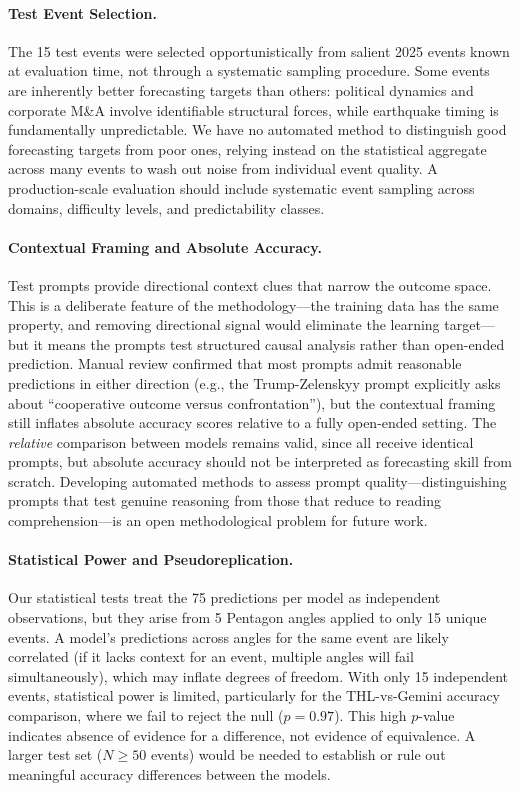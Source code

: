 \documentclass[11pt,a4paper]{article}
\begin{document}
\paragraph{Test Event Selection.}
The 15 test events were selected opportunistically from salient 2025 events known at evaluation time, not through a systematic sampling procedure. Some events are inherently better forecasting targets than others: political dynamics and corporate M\&A involve identifiable structural forces, while earthquake timing is fundamentally unpredictable. We have no automated method to distinguish good forecasting targets from poor ones, relying instead on the statistical aggregate across many events to wash out noise from individual event quality. A production-scale evaluation should include systematic event sampling across domains, difficulty levels, and predictability classes.

\paragraph{Contextual Framing and Absolute Accuracy.}
Test prompts provide directional context clues that narrow the outcome space. This is a deliberate feature of the methodology---the training data has the same property, and removing directional signal would eliminate the learning target---but it means the prompts test structured causal analysis rather than open-ended prediction. Manual review confirmed that most prompts admit reasonable predictions in either direction (e.g., the Trump-Zelenskyy prompt explicitly asks about ``cooperative outcome versus confrontation''), but the contextual framing still inflates absolute accuracy scores relative to a fully open-ended setting. The \textit{relative} comparison between models remains valid, since all receive identical prompts, but absolute accuracy should not be interpreted as forecasting skill from scratch. Developing automated methods to assess prompt quality---distinguishing prompts that test genuine reasoning from those that reduce to reading comprehension---is an open methodological problem for future work.

\paragraph{Statistical Power and Pseudoreplication.}
Our statistical tests treat the 75 predictions per model as independent observations, but they arise from 5 Pentagon angles applied to only 15 unique events. A model's predictions across angles for the same event are likely correlated (if it lacks context for an event, multiple angles will fail simultaneously), which may inflate degrees of freedom. With only 15 independent events, statistical power is limited, particularly for the THL-vs-Gemini accuracy comparison, where we fail to reject the null ($p=0.97$). This high $p$-value indicates absence of evidence for a difference, not evidence of equivalence. A larger test set ($N \geq 50$ events) would be needed to establish or rule out meaningful accuracy differences between the models.
\end{document}
